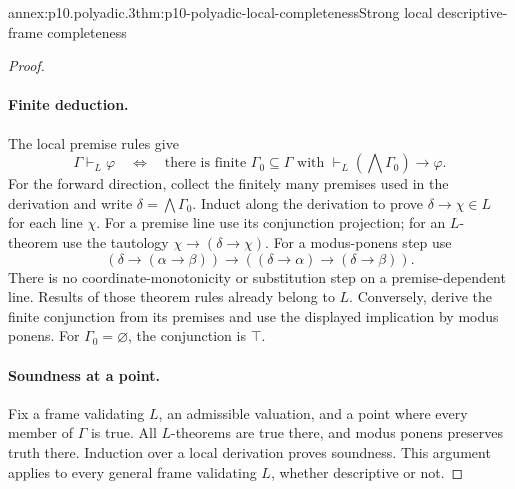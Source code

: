 \begin{annexitem}{annex:p10.polyadic.3}{thm:p10-polyadic-local-completeness}{Strong local descriptive-frame completeness}
\begin{proof}
\paragraph{Finite deduction.}
The local premise rules give
\[
 \Gamma\vdash_L\varphi
 \quad\Longleftrightarrow\quad
 \text{there is finite }\Gamma_0\subseteq\Gamma
 \text{ with }\vdash_L(\bigwedge\Gamma_0)\to\varphi.
\]
For the forward direction, collect the finitely many premises
used in the derivation and write \(\delta=\bigwedge\Gamma_0\).
Induct along the derivation to prove \(\delta\to\chi\in L\)
for each line \(\chi\).
For a premise line use its conjunction projection; for an
\(L\)-theorem use the tautology \(\chi\to(\delta\to\chi)\).
For a modus-ponens step use
\[
 (\delta\to(\alpha\to\beta))\to
             ((\delta\to\alpha)\to(\delta\to\beta)).
\]
There is no coordinate-monotonicity or substitution step on a
premise-dependent line.  Results of those theorem rules already
belong to \(L\).
Conversely, derive the finite conjunction from its premises and
use the displayed implication by modus ponens.
For \(\Gamma_0=\varnothing\), the conjunction is \(\top\).

\paragraph{Soundness at a point.}
Fix a frame validating \(L\), an admissible valuation, and a point
where every member of \(\Gamma\) is true.
All \(L\)-theorems are true there, and modus ponens preserves
truth there.  Induction over a local derivation proves soundness.
This argument applies to every general frame validating \(L\),
whether descriptive or not.


\end{proof}
\end{annexitem}
